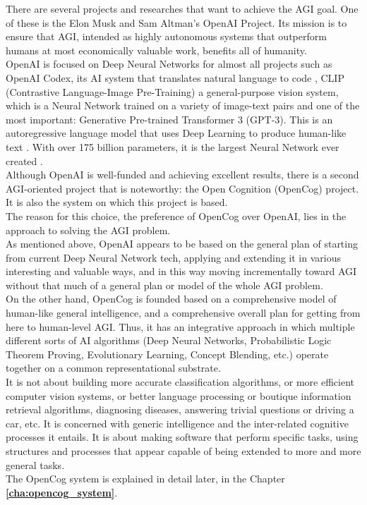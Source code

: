 There are several projects and researches that want to achieve the AGI goal. One of these is the Elon Musk and Sam Altman's OpenAI Project. 
Its mission is to ensure that AGI, intended as highly autonomous systems that outperform humans at most economically valuable work, benefits all of humanity. \\
OpenAI is focused on Deep Neural Networks for almost all projects such as OpenAI Codex, its AI system that translates natural language to code \cite{DBLP:journals/corr/abs-2107-03374}, CLIP (Contrastive Language-Image Pre-Training) a general-purpose vision system, which is a Neural Network trained on a variety of image-text pairs \cite{DBLP:journals/corr/abs-2103-00020} and one of the most important: Generative Pre-trained Transformer 3 (GPT-3). This is an autoregressive language model that uses Deep Learning to produce human-like text \cite{DBLP:journals/corr/abs-2005-14165}. With over 175 billion parameters, it is the largest Neural Network ever created \cite{romero_2021}. \\
Although OpenAI is well-funded and achieving excellent results, there is a second AGI-oriented project that is noteworthy: the Open Cognition (OpenCog) project. It is also the system on which this project is based. \\

The reason for this choice, the preference of OpenCog over OpenAI, lies in the approach to solving the AGI problem.\\
As mentioned above, OpenAI appears to be based on the general plan of starting from current Deep Neural Network tech, applying and extending it in various interesting and valuable ways, and in this way moving incrementally toward AGI without that much of a general plan or model of the whole AGI problem.\\
On the other hand, OpenCog is founded based on a comprehensive model of human-like general intelligence, and a comprehensive overall plan for getting from here to human-level AGI. Thus, it has an integrative approach in which multiple different sorts of AI algorithms (Deep Neural Networks, Probabilistic Logic Theorem Proving, Evolutionary Learning, Concept Blending, etc.) operate together on a common representational substrate. \\
It is not about building more accurate classification algorithms, or more efficient computer vision systems, or better language processing or boutique information retrieval algorithms, diagnosing diseases, answering trivial questions or driving a car, etc. It is concerned with generic intelligence and the inter-related cognitive processes it entails. It is about making software that perform specific tasks, using structures and processes that appear capable of being extended to more and more general tasks. \\
The OpenCog system is explained in detail later, in the Chapter \textbf{\ref{cha:opencog_system}}. \\

